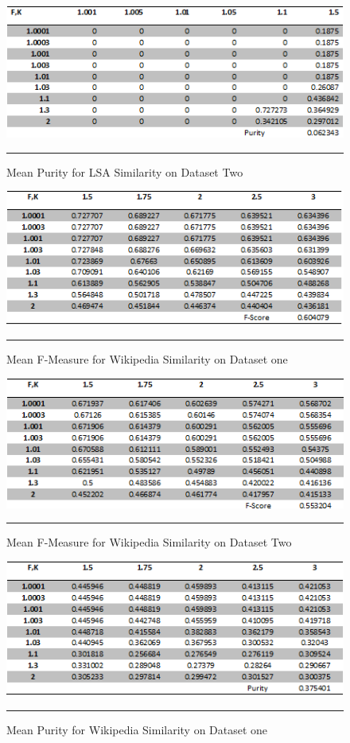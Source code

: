 \begin{figure}[htbp]
	\centering
		\includegraphics{./Figures/lsa_Purity_DS2.png}
		\rule{35em}{0.5pt}
	\caption[Mean Purity for LSA Similarity on Dataset Two]{Mean Purity for LSA Similarity on Dataset Two}
	\label{fig:F4}
\end{figure}

\begin{figure}[htbp]
	\centering
		\includegraphics{./Figures/wiki_F_DS1.png}
		\rule{35em}{0.5pt}
	\caption[Mean F-Measure for Wikipedia Similarity on Dataset one]{Mean F-Measure for Wikipedia Similarity on Dataset one}
	\label{fig:F5}
\end{figure}

\begin{figure}[htbp]
	\centering
		\includegraphics{./Figures/wiki_F_DS2.png}
		\rule{35em}{0.5pt}
	\caption[Mean F-Measure for Wikipedia Similarity on Dataset Two]{Mean F-Measure for Wikipedia Similarity on Dataset Two}
	\label{fig:F6}
\end{figure}

\begin{figure}[htbp]
	\centering
		\includegraphics{./Figures/wiki_Purity_DS1.png}
		\rule{35em}{0.5pt}
	\caption[Mean Purity for Wikipedia Similarity on Dataset one]{Mean Purity for Wikipedia Similarity on Dataset one}
	\label{fig:F7}
\end{figure}

